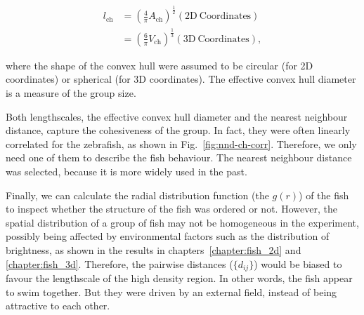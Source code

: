 \documentclass[11pt,twoside]{report}
\begin{document}
\begin{equation}
\begin{split}
	l_\mathrm{ch}
	&= \left(
	\frac{4}{\pi} A_\mathrm{ch}
	\right)^\frac12 (\mathrm{2D}\ \mathrm{Coordinates}) \\[1.5ex]
	&= \left(
	\frac{6}{\pi} V_\mathrm{ch}
	\right)^\frac13 (\mathrm{3D}\ \mathrm{Coordinates}),
\end{split}
\label{eq:convex-hull-diameter}
\end{equation}

\noindent where the shape of the convex hull were assumed to be circular (for 2D coordinates) or spherical (for 3D coordinates). The effective convex hull diameter is a measure of the group size.

Both lengthscales, the effective convex hull diameter and the nearest neighbour distance, capture the cohesiveness of the group. In fact, they were often linearly correlated for the zebrafish, as shown in Fig.~\ref{fig:nnd-ch-corr}. Therefore, we only need one of them to describe the fish behaviour. The nearest neighbour distance was selected, because it is more widely used in the past.



Finally, we can calculate the radial distribution function (the $g(r)$) of the fish to inspect whether the structure of the fish was ordered or not. However, the spatial distribution of a group of fish may not be homogeneous in the experiment, possibly being affected by environmental factors such as the distribution of brightness, as shown in the results in chapters~\ref{chapter:fish_2d} and \ref{chapter:fish_3d}. Therefore, the pairwise distances ($\{ d_{ij} \}$) would be biased to favour the lengthscale of the high density region. In other words, the fish appear to swim together. But they were driven by an external field, instead of being attractive to each other.
\end{document}
